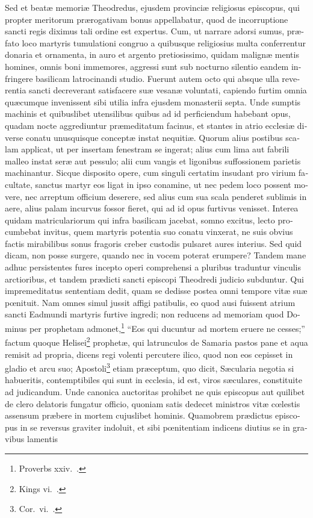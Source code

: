 \documentclass[10pt]{book}
\begin{document}
\begin{paracol}{2}
\switchcolumn*

\begin{otherlanguage}{latin}
Sed et beat\ae{} memori\ae{} Theodredus, ejusdem provinci\ae{} religiosus episcopus, qui propter meritorum pr\ae{}rogativam bonus appellabatur, quod de incorruptione sancti regis diximus tali ordine est expertus. Cum, ut narrare adorsi sumus, pr\ae{}fato loco martyris tumulationi congruo a quibusque religiosius multa conferrentur donaria et ornamenta, in auro et argento pretiosissimo, quidam malign\ae{} mentis homines, omnis boni immemores, aggressi sunt sub nocturno silentio eandem infringere basilicam latrocinandi studio. Fuerunt autem octo qui absque ulla reverentia sancti decreverant satisfacere su\ae{} vesan\ae{} voluntati, capiendo furtim omnia qu\ae{}cumque invenissent sibi utilia infra  ejusdem monasterii septa. Unde sumptis machinis et quibuslibet utensilibus quibus ad id perficiendum habebant opus, quadam nocte aggrediuntur pr\ae{}meditatum facinus, et stantes in atrio ecclesi\ae{} diverse conatu unusquisque concept\ae{} instat nequiti\ae{}. Quorum alius postibus scalam applicat, ut per insertam fenestram se ingerat; alius cum lima aut fabrili malleo instat ser\ae{} aut pessulo; alii cum vangis et ligonibus suffossionem parietis machinantur. Sicque disposito opere, cum singuli certatim insudant pro virium facultate, sanctus martyr eos ligat in ipso conamine, ut nec pedem loco possent movere, nec arreptum officium deserere, sed alius cum sua scala penderet sublimis in aere, alius palam incurvus fossor fieret, qui ad id opus furtivus venisset. Interea quidam matriculariorum qui infra basilicam jacebat, somno excitus, lecto procumbebat invitus, quem martyris potentia suo conatu vinxerat, ne suis obvius factis mirabilibus sonus fragoris creber custodis pulsaret aures interius. Sed quid dicam, non posse surgere, quando nec in vocem poterat erumpere? Tandem mane adhuc persistentes fures incepto operi comprehensi a pluribus traduntur vinculis arctioribus, et tandem pr\ae{}dicti sancti episcopi Theodredi judicio subduntur. Qui impremeditatus sententiam dedit, quam se dedisse postea omni tempore vit\ae{} su\ae{} p\oe{}nituit. Nam omnes simul jussit affigi patibulis, eo quod ausi fuissent atrium sancti Eadmundi martyris furtive ingredi; non reducens ad memoriam quod Dominus per prophetam admonet,\footnote{Proverbs xxiv.\ .} ``Eos qui ducuntur ad mortem eruere ne cesses;'' factum quoque Helisei\footnote{ Kings vi.\ .} prophet\ae{}, qui latrunculos de Samaria pastos pane et aqua remisit ad propria, dicens regi volenti percutere ilico, quod non eos cepisset in gladio et arcu suo; Apostoli\footnote{ Cor.\ vi.\ .} etiam pr\ae{}ceptum, quo dicit, S\ae{}cularia negotia si habueritis, contemptibiles qui sunt in ecclesia, id est, viros s\ae{}culares, constituite ad judicandum. Unde canonica auctoritas prohibet ne quis episcopus aut quilibet de clero delatoris fungatur officio, quoniam satis dedecet ministros vit\ae{} c\oe{}lestis assensum pr\ae{}bere in mortem cujuslibet hominis. Quamobrem pr\ae{}dictus episcopus in se reversus graviter indoluit, et sibi p\oe{}nitentiam indicens diutius se in gravibus lamentis 
\end{otherlanguage}
\end{paracol}
\end{document}
